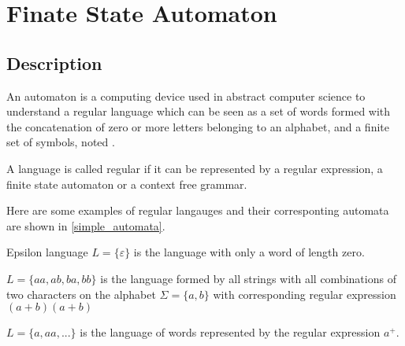 \section{Finate State Automaton}

\subsection{Description}
An automaton \automaton{} is a computing device used in abstract computer science to understand a regular language \lang{} which can be seen as a set of words formed with the concatenation of zero or more letters  belonging to an alphabet, and a finite set of symbols, noted \alphabet{}.

\begin{theorem}
    A language is called regular if it can be represented by a regular expression, a finite state automaton or a context free grammar.
\end{theorem}

Here are some examples of regular langauges and their corresponting automata are shown in \cref{simple_automata}.
\begin{example}{Epsilon language}
    \label{example:lang_eps}
    $L = \{\varepsilon\}$ is the language with only a word of length zero.
\end{example}

\begin{example}
    \label{example:lang_ab_len2}
    $L = \{aa, ab, ba, bb\}$ is the language formed by all strings with all combinations of two characters on the alphabet $\Sigma = \{a, b\}$ with corresponding regular expression $(a+b)(a+b)$
\end{example}

\begin{example}
    \label{example:a_plus}
    $L = \{a, aa, ...\}$ is the language of words represented by the regular expression $a^+$.
\end{example}

